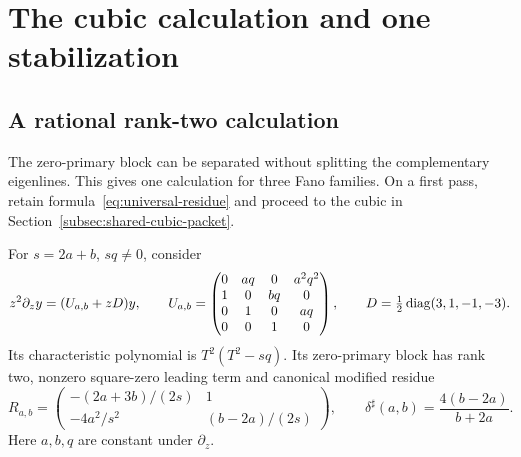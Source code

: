 \section{The cubic calculation and one stabilization}\label{sec:cubic-proof}
\subsection{A rational rank-two calculation}

The zero-primary block can be separated without splitting the complementary
eigenlines. This gives one calculation for three Fano families. On a first
pass, retain formula~\eqref{eq:universal-residue} and proceed to the cubic
in Section~\ref{subsec:shared-cubic-packet}.

\begin{proposition}
\label{prop:universal-rank-two-residue}
%
%
%
For \(s=2a+b\), \(sq\ne0\), consider
\[
 z^2\partial_z y=(U_{a,b}+zD)y,\qquad
 U_{a,b}=\begin{pmatrix}
 0&aq&0&a^2q^2\\1&0&bq&0\\0&1&0&aq\\0&0&1&0
 \end{pmatrix},\qquad D=\tfrac12\operatorname{diag}(3,1,-1,-3).
\]
Its characteristic polynomial is \(T^2(T^2-sq)\).  Its zero-primary block
has rank two, nonzero square-zero leading term and canonical modified residue
\begin{equation}
 R_{a,b}=
 \begin{pmatrix}
 -(2a+3b)/(2s)&1\\
 -4a^2/s^2&(b-2a)/(2s)
 \end{pmatrix},\qquad
 \delta^\sharp(a,b)=\frac{4(b-2a)}{b+2a}.
 \label{eq:universal-residue}
\end{equation}
Here \(a,b,q\) are constant under \(\partial_z\).
\end{proposition}

